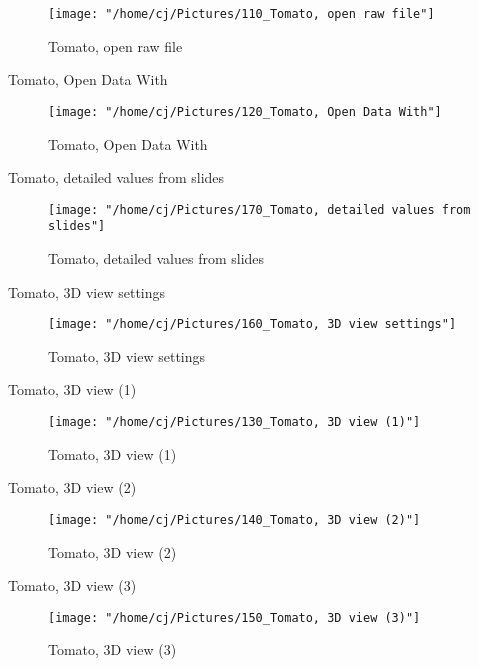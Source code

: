 \documentclass{article}
\begin{document}
\begin{figure}[H]
  \centering
  \texttt{[image: "/home/cj/Pictures/110\_Tomato, open raw file"]}
  \caption{Tomato, open raw file}
  \label{}
\end{figure}


Tomato, Open Data With

\begin{figure}[H]
  \centering
  \texttt{[image: "/home/cj/Pictures/120\_Tomato, Open Data With"]}
  \caption{Tomato, Open Data With}
  \label{}
\end{figure}

\break
Tomato, detailed values from slides

\begin{figure}[H]
  \centering
  \texttt{[image: "/home/cj/Pictures/170\_Tomato, detailed values from slides"]}
  \caption{Tomato, detailed values from slides}
  \label{}
\end{figure}

\break
Tomato, 3D view settings

\begin{figure}[H]
  \centering
  \texttt{[image: "/home/cj/Pictures/160\_Tomato, 3D view settings"]}
  \caption{Tomato, 3D view settings}
  \label{}
\end{figure}

\break
Tomato, 3D view (1)

\begin{figure}[H]
  \centering
  \texttt{[image: "/home/cj/Pictures/130\_Tomato, 3D view (1)"]}
  \caption{Tomato, 3D view (1)}
  \label{}
\end{figure}


Tomato, 3D view (2)

\begin{figure}[H]
  \centering
  \texttt{[image: "/home/cj/Pictures/140\_Tomato, 3D view (2)"]}
  \caption{Tomato, 3D view (2)}
  \label{}
\end{figure}

\break
Tomato, 3D view (3)

\begin{figure}[H]
  \centering
  \texttt{[image: "/home/cj/Pictures/150\_Tomato, 3D view (3)"]}
  \caption{Tomato, 3D view (3)}
  \label{}
\end{figure}

\newpage
\end{document}
